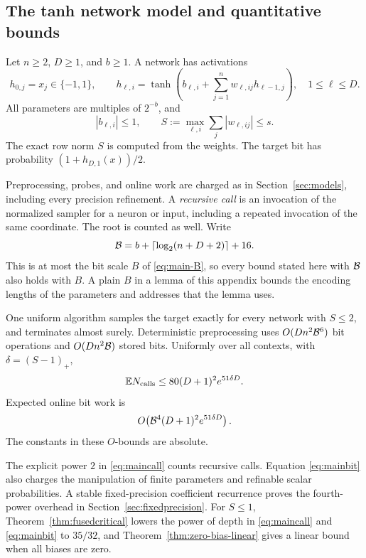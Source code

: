 \subsection{The tanh network model and quantitative bounds}\label{app:tanhmodel}
Let \(n\ge2\), \(D\ge1\), and \(b\ge1\). A network has activations
\begin{equation}\label{eq:network}
h_{0,j}=x_j\in\{-1,1\},\qquad
h_{\ell,i}=\tanh\!\left(b_{\ell,i}
+\sum_{j=1}^n w_{\ell,ij}h_{\ell-1,j}\right),
\quad 1\le\ell\le D.
\end{equation}
All parameters are multiples of \(2^{-b}\), and
\[
|b_{\ell,i}|\le1,\qquad
S:=\max_{\ell,i}\sum_j|w_{\ell,ij}|\le s.
\]
The exact row norm \(S\) is computed from the weights. The target
bit has probability \((1+h_{D,1}(x))/2\).

Preprocessing, probes, and online work are charged as in
Section~\ref{sec:models}, including every precision refinement.
A \emph{recursive call} is an invocation of the
normalized sampler for a neuron or input, including a repeated
invocation of the same coordinate. The root is counted as well.
Write
\begin{equation}\label{eq:bitlength}
\mathcal B=b+\lceil\log_2(n+D+2)\rceil+16.
\end{equation}
This is at most the bit scale \(B\) of \eqref{eq:main-B}, so every
bound stated here with \(\mathcal B\) also holds with \(B\). A plain \(B\)
in a lemma of this appendix bounds the encoding lengths of the
parameters and addresses that the lemma uses.

\begin{theorem}\label{thm:upper}
One uniform algorithm samples the target exactly for every network
with \(S\le2\), and terminates almost surely. Deterministic preprocessing
uses \(O(Dn^2\mathcal B^6)\) bit operations and \(O(Dn^2\mathcal B)\) stored bits.
Uniformly over all contexts, with \(\delta=(S-1)_+\),
\begin{equation}\label{eq:maincall}
\mathbb E N_{\rm calls}\le80(D+1)^2e^{51\delta D}.
\end{equation}
Expected online bit work is
\begin{equation}\label{eq:mainbit}
O\!\left(\mathcal B^4(D+1)^2e^{51\delta D}\right).
\end{equation}
The constants in these \(O\)-bounds are absolute.
\end{theorem}

The explicit power \(2\) in \eqref{eq:maincall} counts recursive
calls. Equation \eqref{eq:mainbit} also charges the manipulation of
finite parameters and refinable scalar probabilities. A stable
fixed-precision coefficient recurrence proves the fourth-power
overhead in Section~\ref{sec:fixedprecision}.
For \(S\le1\), Theorem~\ref{thm:fusedcritical} lowers the power of
depth in \eqref{eq:maincall} and \eqref{eq:mainbit} to \(35/32\),
and Theorem~\ref{thm:zero-bias-linear} gives a linear bound when all
biases are zero.

